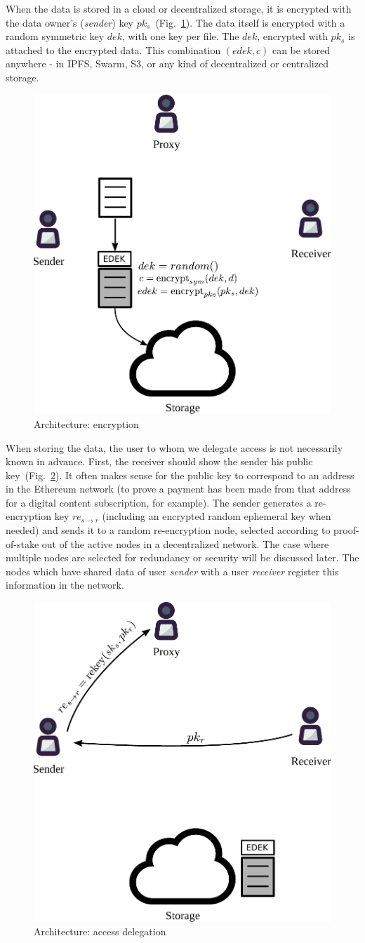 \documentclass[longbibliography,nofootinbib]{revtex4-1}
\newcommand{\figref}[1]{Fig.~\ref{#1}}
\begin{document}
When the data is stored in a cloud or decentralized storage, it is encrypted with the data owner's (\emph{sender}) key $pk_s$~(\figref{fig:arch-encrypt}).
The data itself is encrypted with a random symmetric key $dek$, with one key per file.
The $dek$, encrypted with $pk_s$ is attached to the encrypted data.
This combination $(edek, c)$ can be stored anywhere - in IPFS, Swarm, S3, or any kind of decentralized or centralized storage.
\begin{figure}
\centering
    \includegraphics[width=0.4\columnwidth]{pdf/encrypt.pdf}
    \caption{Architecture: encryption}
    \label{fig:arch-encrypt}
\end{figure}

When storing the data, the user to whom we delegate access is not necessarily known in advance.
First, the receiver should show the sender his public key~(\figref{fig:arch-delegate}).
It often makes sense for the public key to correspond to an address in the Ethereum network (to prove a payment has been made from that
address for a digital content subscription, for example).
The sender generates a re-encryption key $re_{s\rightarrow r}$ (including an encrypted random ephemeral key when needed) and sends it to a random re-encryption
node, selected according to proof-of-stake out of the active nodes in a decentralized network.
The case where multiple nodes are selected for redundancy or security will be discussed later.
The nodes which have shared data of user \emph{sender} with a user \emph{receiver} register this information in the network.
\begin{figure}
\centering
    \includegraphics[width=0.4\columnwidth]{pdf/delegate.pdf}
    \caption{Architecture: access delegation}
    \label{fig:arch-delegate}
\end{figure}
\end{document}
